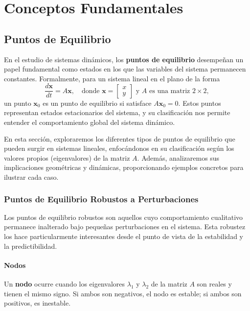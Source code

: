 \chapter{Conceptos Fundamentales}

\section{Puntos de Equilibrio}

En el estudio de sistemas dinámicos, los \textbf{puntos de equilibrio} desempeñan un papel fundamental como estados en los que las variables del sistema permanecen constantes. Formalmente, para un sistema lineal en el plano de la forma 
\[
\frac{d\mathbf{x}}{dt} = A\mathbf{x}, \quad \text{donde } \mathbf{x} = \begin{bmatrix} x \\ y \end{bmatrix} \text{ y } A \text{ es una matriz } 2 \times 2,
\]
un punto $\mathbf{x}_0$ es un punto de equilibrio si satisface $A\mathbf{x}_0 = 0$. Estos puntos representan estados estacionarios del sistema, y su clasificación nos permite entender el comportamiento global del sistema dinámico.

En esta sección, exploraremos los diferentes tipos de puntos de equilibrio que pueden surgir en sistemas lineales, enfocándonos en su clasificación según los valores propios (eigenvalores) de la matriz $A$. Además, analizaremos sus implicaciones geométricas y dinámicas, proporcionando ejemplos concretos para ilustrar cada caso.

\subsection{Puntos de Equilibrio Robustos a Perturbaciones}

Los puntos de equilibrio robustos son aquellos cuyo comportamiento cualitativo permanece inalterado bajo pequeñas perturbaciones en el sistema. Esta robustez los hace particularmente interesantes desde el punto de vista de la estabilidad y la predictibilidad.

\subsubsection{Nodos}

\begin{definition}
Un \textbf{nodo} ocurre cuando los eigenvalores $\lambda_1$ y $\lambda_2$ de la matriz $A$ son reales y tienen el mismo signo. Si ambos son negativos, el nodo es estable; si ambos son positivos, es inestable.
\end{definition}

